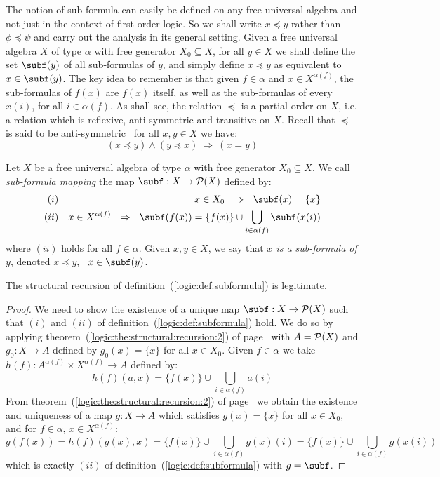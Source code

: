 The notion of sub-formula can easily be defined on any free
universal algebra and not just in the context of first order logic.
So we shall write $x\preceq y$ rather than $\phi\preceq\psi$ and
carry out the analysis in its general setting. Given a free
universal algebra $X$ of type $\alpha$ with free generator
$X_{0}\subseteq X$, for all $y\in X$ we shall define the set
$\subf(y)$ of all sub-formulas of $y$, and simply define $x\preceq
y$ as equivalent to $x\in\subf(y)$. The key idea to remember is that
given $f\in\alpha$ and $x\in X^{\alpha(f)}$, the sub-formulas of
$f(x)$ are $f(x)$ itself, as well as the sub-formulas of every
$x(i)$, for all $i\in\alpha(f)$. As shall see, the relation
$\preceq$ is a partial order on $X$, i.e. a relation which is
reflexive, anti-symmetric and transitive on $X$. Recall that
$\preceq$ is said to be anti-symmetric \ifand\ for all $x,y\in X$ we
have:
    \[
    (x\preceq y)\land(y\preceq x)\ \Rightarrow\ (x=y)
    \]
\begin{defin}\label{logic:def:subformula}
Let $X$ be a free universal algebra of type $\alpha$ with free
generator $X_{0}\subseteq X$. We call {\em sub-formula mapping} the
map $\subf:X\to{\cal P}(X)$ defined by:
 \begin{eqnarray*}
    (i)&& x\in X_{0}\ \ \Rightarrow\ \ \subf(x)=\{x\}\\
    (ii)&& x\in X^{\alpha(f)}\ \ \Rightarrow\ \ \subf(f(x)) =
    \{f(x)\}\cup\bigcup_{i\in\alpha(f)}\subf(x(i))
    \end{eqnarray*}
where $(ii)$ holds for all $f\in\alpha$. Given $x,y\in X$, we say
that {\em $x$ is a sub-formula of $y$}, denoted $x\preceq y$,
\ifand\ $x\in\subf(y)$.
\end{defin}

\begin{prop}\label{logic:prop:subformula:recursion}
The structural recursion of definition~(\ref{logic:def:subformula})
is legitimate.
\end{prop}
\begin{proof}
We need to show the existence of a unique map $\subf:X\to{\cal
P}(X)$ such that $(i)$ and $(ii)$ of
definition~(\ref{logic:def:subformula}) hold. We do so by applying
theorem~(\ref{logic:the:structural:recursion:2}) of
page~\pageref{logic:the:structural:recursion:2} with $A={\cal P}(X)$
and $g_{0}:X\to A$ defined by $g_{0}(x)=\{x\}$ for all $x\in X_{0}$.
Given $f\in\alpha$ we take $h(f):A^{\alpha(f)}\times
X^{\alpha(f)}\to A$ defined by:
    \[
    h(f)(a,x)=\{f(x)\}\cup\bigcup_{i\in\alpha(f)}a(i)
    \]
From theorem~(\ref{logic:the:structural:recursion:2}) of
page~\pageref{logic:the:structural:recursion:2} we obtain the
existence and uniqueness of a map $g:X\to A$ which satisfies
$g(x)=\{x\}$ for all $x\in X_{0}$, and for $f\in\alpha$, $x\in
X^{\alpha(f)}$:
    \[
    g(f(x))=h(f)(g(x),x)=\{f(x)\}\cup\bigcup_{i\in\alpha(f)}g(x)(i)
    =\{f(x)\}\cup\bigcup_{i\in\alpha(f)}g(x(i))
    \]
which is exactly $(ii)$ of definition~(\ref{logic:def:subformula})
with $g=\subf$.
\end{proof}
